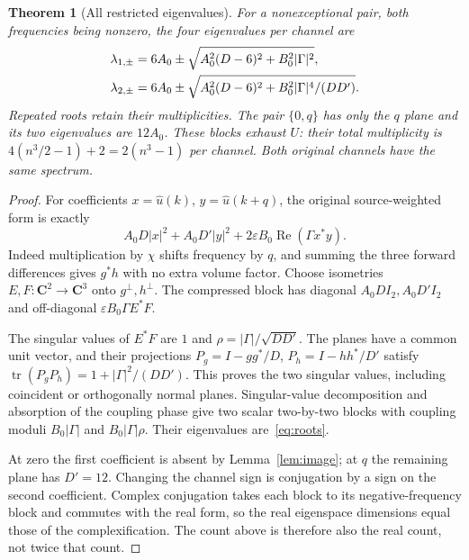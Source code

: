 \documentclass[11pt]{article}
\newcommand{\C}{\mathbf C}
\DeclareMathOperator{\tr}{tr}
\DeclareMathOperator{\Rea}{Re}
\newtheorem{theorem}{Theorem}[section]
\theoremstyle{definition}
\theoremstyle{remark}
\begin{document}
\begin{theorem}[All restricted eigenvalues]\label{thm:spectrum}
For a nonexceptional pair, both frequencies being nonzero, the four
eigenvalues per channel are
\begin{align}\label{eq:roots}
 \lambda_{1,\pm}&=6A_0\pm\sqrt{A_0^2(D-6)^2+B_0^2|\Gamma|^2},\\
 \lambda_{2,\pm}&=6A_0\pm\sqrt{A_0^2(D-6)^2+
                           B_0^2|\Gamma|^4/(DD')}.\notag
\end{align}
Repeated roots retain their multiplicities. The pair $\{0,q\}$ has only
the $q$ plane and its two eigenvalues are $12A_0$. These blocks exhaust
$U$: their total multiplicity is $4(n^3/2-1)+2=2(n^3-1)$ per channel.
Both original channels have the same spectrum.
\end{theorem}
\begin{proof}
For coefficients $x=\widehat u(k)$, $y=\widehat u(k+q)$, the original
source-weighted form is exactly
\[
 A_0D|x|^2+A_0D'|y|^2+2\varepsilon B_0\Rea(\Gamma x^*y).
\]
Indeed multiplication by $\chi$ shifts frequency by $q$, and summing the
three forward differences gives $g^*h$ with no extra volume factor.
Choose isometries $E,F:\C^2\to\C^3$ onto $g^\perp,h^\perp$. The compressed
block has diagonal $A_0DI_2,A_0D'I_2$ and off-diagonal
$\varepsilon B_0\Gamma E^*F$.

The singular values of $E^*F$ are $1$ and
$\rho=|\Gamma|/\sqrt{DD'}$. The planes have a common unit vector, and their
projections $P_g=I-gg^*/D$, $P_h=I-hh^*/D'$ satisfy
$\tr(P_gP_h)=1+|\Gamma|^2/(DD')$. This proves the two singular values,
including coincident or orthogonally normal planes. Singular-value
decomposition and absorption of the coupling phase give two scalar
two-by-two blocks with coupling moduli $B_0|\Gamma|$ and $B_0|\Gamma|\rho$.
Their eigenvalues are~\eqref{eq:roots}.

At zero the first coefficient is absent by Lemma~\ref{lem:image}; at $q$
the remaining plane has $D'=12$. Changing the channel sign is conjugation
by a sign on the second coefficient. Complex conjugation takes each block
to its negative-frequency block and commutes with the real form, so the
real eigenspace dimensions equal those of the complexification. The count
above is therefore also the real count, not twice that count.
\end{proof}
\end{document}
